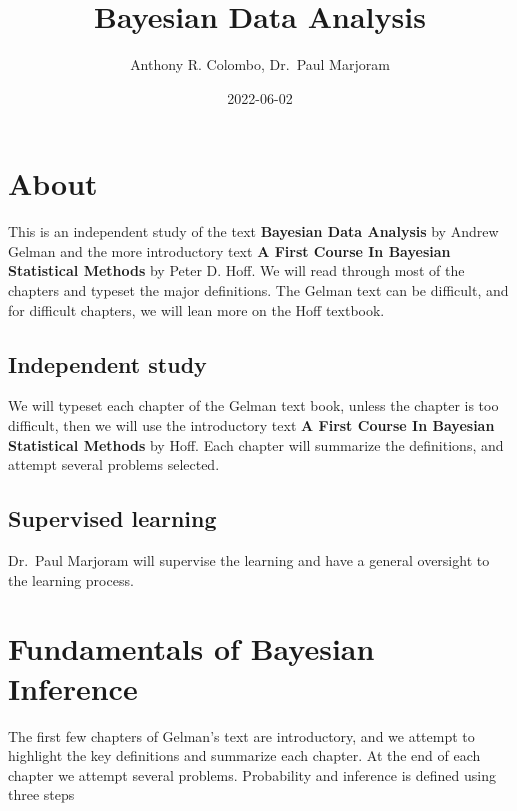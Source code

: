 \documentclass[
]{book}
\title{Bayesian Data Analysis}
\author{Anthony R. Colombo, Dr.~Paul Marjoram}
\date{2022-06-02}
\theoremstyle{definition}
\theoremstyle{definition}
\theoremstyle{definition}
\theoremstyle{definition}
\theoremstyle{remark}
\begin{document}
\maketitle

{
\setcounter{tocdepth}{1}
\tableofcontents
}
\hypertarget{about}{%
\chapter*{About}\label{about}}

This is an independent study of the text \textbf{Bayesian Data Analysis} by Andrew Gelman and the more introductory text \textbf{A First Course In Bayesian Statistical Methods} by Peter D. Hoff. We will read through most of the chapters and typeset the major definitions. The Gelman text can be difficult, and for difficult chapters, we will lean more on the Hoff textbook.

\hypertarget{independent-study}{%
\section*{Independent study}\label{independent-study}}

We will typeset each chapter of the Gelman text book, unless the chapter is too difficult, then we will use the introductory text \textbf{A First Course In Bayesian Statistical Methods} by Hoff. Each chapter will summarize the definitions, and attempt several problems selected.

\hypertarget{supervised-learning}{%
\section*{Supervised learning}\label{supervised-learning}}

Dr.~Paul Marjoram will supervise the learning and have a general oversight to the learning process.

\hypertarget{fundamentals-of-bayesian-inference}{%
\chapter{Fundamentals of Bayesian Inference}\label{fundamentals-of-bayesian-inference}}

The first few chapters of Gelman's text are introductory, and we attempt to highlight the key definitions and summarize each chapter. At the end of each chapter we attempt several problems. Probability and inference is defined using three steps
\end{document}
